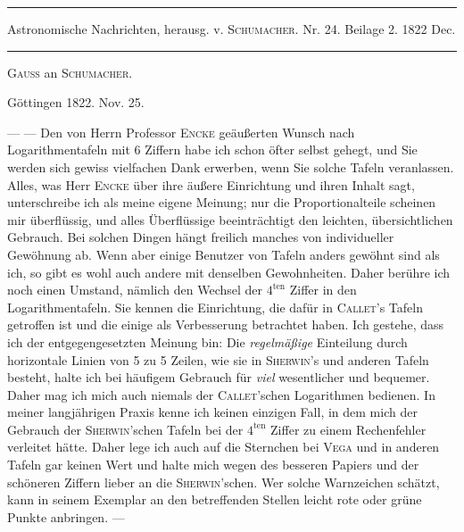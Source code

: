 \par{}\begin{center}\rule{0.72\linewidth}{0.3pt}\par Astronomische Nachrichten, herausg. v. \textsc{Schumacher}. Nr. 24. Beilage 2. 1822 Dec.\par\rule{0.72\linewidth}{0.3pt}\end{center}

\begin{center}
\textsc{Gauss} an \textsc{Schumacher}.
\end{center}
\begin{flushright}
Göttingen 1822. Nov. 25.
\end{flushright}
--- --- Den von Herrn Professor \textsc{Encke} geäußerten Wunsch nach Logarithmentafeln mit 6 Ziffern habe ich schon öfter selbst gehegt, und Sie werden sich gewiss vielfachen Dank erwerben, wenn Sie solche Tafeln veranlassen. Alles, was Herr \textsc{Encke} über ihre äußere Einrichtung und ihren Inhalt sagt, unterschreibe ich als meine eigene Meinung; nur die Proportionalteile scheinen mir überflüssig, und alles Überflüssige beeinträchtigt den leichten, übersichtlichen Gebrauch. Bei solchen Dingen hängt freilich manches von individueller Gewöhnung ab. Wenn aber einige Benutzer von Tafeln anders gewöhnt sind als ich, so gibt es wohl auch andere mit denselben Gewohnheiten. Daher berühre ich noch einen Umstand, nämlich den Wechsel der \(4^{\mathrm{ten}}\) Ziffer in den Logarithmentafeln. Sie kennen die Einrichtung, die dafür in \textsc{Callet}'s Tafeln getroffen ist und die einige als Verbesserung betrachtet haben. Ich gestehe, dass ich der entgegengesetzten Meinung bin: Die \textit{regelmäßige} Einteilung durch horizontale Linien von 5 zu 5 Zeilen, wie sie in \textsc{Sherwin}'s und anderen Tafeln besteht, halte ich bei häufigem Gebrauch für \textit{viel} wesentlicher und bequemer. Daher mag ich mich auch niemals der \textsc{Callet}'schen Logarithmen bedienen. In meiner langjährigen Praxis kenne ich keinen einzigen Fall, in dem mich der Gebrauch der \textsc{Sherwin}'schen Tafeln bei der \(4^{\mathrm{ten}}\) Ziffer zu einem Rechenfehler verleitet hätte. Daher lege ich auch auf die Sternchen bei \textsc{Vega} und in anderen Tafeln gar keinen Wert und halte mich wegen des besseren Papiers und der schöneren Ziffern lieber an die \textsc{Sherwin}'schen. Wer solche Warnzeichen schätzt, kann in seinem Exemplar an den betreffenden Stellen leicht rote oder grüne Punkte anbringen. ---
